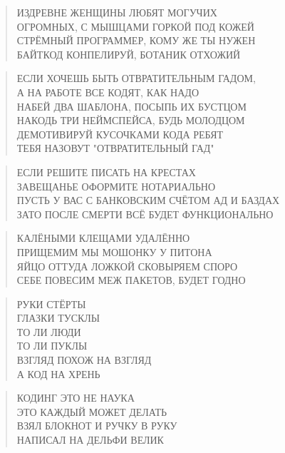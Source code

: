 \poemtitle{***}
\begin{verse}
ИЗДРЕВНЕ ЖЕНЩИНЫ ЛЮБЯТ МОГУЧИХ\\
ОГРОМНЫХ, С МЫШЦАМИ ГОРКОЙ ПОД КОЖЕЙ\\
СТРЁМНЫЙ ПРОГРАММЕР, КОМУ ЖЕ ТЫ НУЖЕН\\
БАЙТКОД КОНПЕЛИРУЙ, БОТАНИК ОТХОЖИЙ
\end{verse}

\poemtitle{***}
\begin{verse}
ЕСЛИ ХОЧЕШЬ БЫТЬ ОТВРАТИТЕЛЬНЫМ ГАДОМ,\\
А НА РАБОТЕ ВСЕ КОДЯТ, КАК НАДО\\
НАБЕЙ ДВА ШАБЛОНА, ПОСЫПЬ ИХ БУСТЦОМ\\
НАКОДЬ ТРИ НЕЙМСПЕЙСА, БУДЬ МОЛОДЦОМ\\
ДЕМОТИВИРУЙ КУСОЧКАМИ КОДА РЕБЯТ\\
ТЕБЯ НАЗОВУТ "ОТВРАТИТЕЛЬНЫЙ ГАД"
\end{verse}

\poemtitle{***}
\begin{verse}
ЕСЛИ РЕШИТЕ ПИСАТЬ НА КРЕСТАХ\\
ЗАВЕЩАНЬЕ ОФОРМИТЕ НОТАРИАЛЬНО\\
ПУСТЬ У ВАС С БАНКОВСКИМ СЧЁТОМ АД И БАЗДАХ\\
ЗАТО ПОСЛЕ СМЕРТИ ВСЁ БУДЕТ ФУНКЦИОНАЛЬНО
\end{verse}

\poemtitle{***}
\begin{verse}
КАЛЁНЫМИ КЛЕЩАМИ УДАЛЁННО\\
ПРИЩЕМИМ МЫ МОШОНКУ У ПИТОНА\\
ЯЙЦО ОТТУДА ЛОЖКОЙ СКОВЫРЯЕМ СПОРО\\
СЕБЕ ПОВЕСИМ МЕЖ ПАКЕТОВ, БУДЕТ ГОДНО
\end{verse}

\poemtitle{***}
\begin{verse}
РУКИ СТЁРТЫ\\
ГЛАЗКИ ТУСКЛЫ\\
ТО ЛИ ЛЮДИ\\
ТО ЛИ ПУКЛЫ\\
ВЗГЛЯД ПОХОЖ НА ВЗГЛЯД\\
А КОД НА ХРЕНЬ
\end{verse}

\poemtitle{***}
\begin{verse}
КОДИНГ ЭТО НЕ НАУКА\\
ЭТО КАЖДЫЙ МОЖЕТ ДЕЛАТЬ\\
ВЗЯЛ БЛОКНОТ И РУЧКУ В РУКУ\\
НАПИСАЛ НА ДЕЛЬФИ ВЕЛИК
\end{verse}

